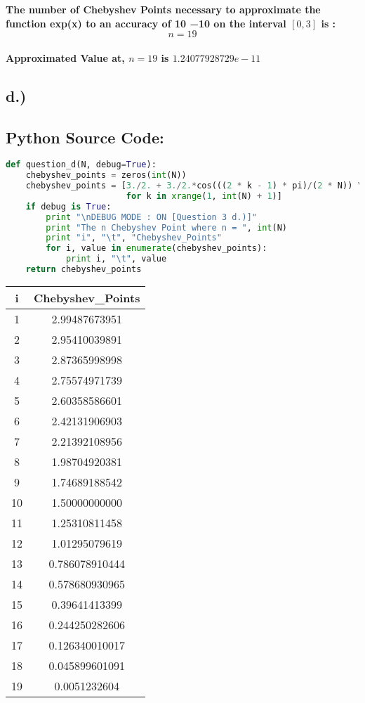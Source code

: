 \documentclass{article}
\begin{document}
\textbf{The number of Chebyshev Points necessary to approximate the function exp(x) to an accuracy of 10 −10 on the interval $[0, 3]$ is :\\
\[n = 19\] \\ Approximated Value at,  $n = 19 $ is $ 1.24077928729e-11$}


\pagebreak

\subsection*{d.)}
\subsection*{Python Source Code:}
\begin{lstlisting}[language=Python]
def question_d(N, debug=True):
    chebyshev_points = zeros(int(N))
    chebyshev_points = [3./2. + 3./2.*cos(((2 * k - 1) * pi)/(2 * N)) \
                        for k in xrange(1, int(N) + 1)]
    if debug is True:
        print "\nDEBUG MODE : ON [Question 3 d.)]"
        print "The n Chebyshev Point where n = ", int(N)
        print "i", "\t", "Chebyshev_Points"
        for i, value in enumerate(chebyshev_points):
            print i, "\t", value
    return chebyshev_points
\end{lstlisting}

\begin{center}
    \begin{tabular}{||c| c||} 
    \hline
    \textbf{i } & \textbf{Chebyshev_Points} \\ [0.5ex] 
    \hline\hline
    1  &  2.99487673951\\[1ex] 
    \hline
    2  &  2.95410039891\\[1ex]
    \hline
    3  &  2.87365998998\\[1ex]
    \hline
    4  &  2.75574971739\\[1ex]
    \hline
    5  &  2.60358586601\\[1ex]
    \hline
    6  &  2.42131906903\\[1ex]
    \hline
    7  &  2.21392108956\\[1ex]
    \hline
    8  &  1.98704920381\\[1ex]
    \hline
    9  &  1.74689188542\\[1ex]
    \hline
    10 &  1.50000000000\\[1ex]
    \hline
    11 &   1.25310811458\\[1ex]
    \hline
    12 &   1.01295079619\\[1ex]
    \hline
    13 &   0.786078910444\\[1ex]
    \hline
    14 &     0.578680930965\\[1ex]
    \hline
    15 &   0.39641413399\\[1ex]
    \hline
    16 &  0.244250282606\\[1ex]
    \hline
    17 &  0.126340010017\\[1ex]
    \hline
    18 &   0.045899601091\\[1ex]
        \hline
    19 &    0.0051232604\\[1ex]
    \hline
    \end{tabular}
\end{center}
\end{document}
